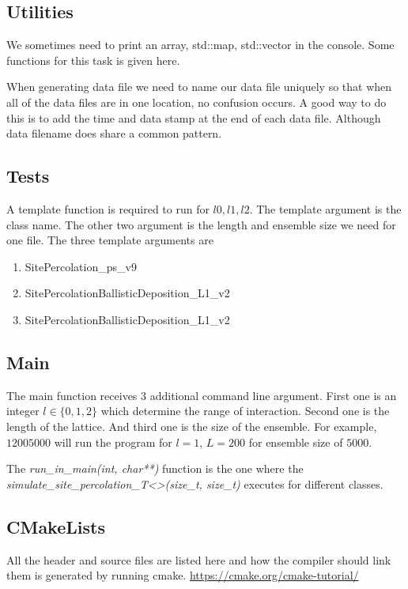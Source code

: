 	
	
	
	\subsection{Utilities}
	We sometimes need to print an array, std::map, std::vector in the console. Some functions for this task is given here. 
	
	
	When generating data file we need to name our data file uniquely so that when all of the data files are in one location, no confusion occurs. A good way to do this is to add the time and data stamp at the end of each data file. Although data filename does share a common pattern.
	
	
	
	\subsection{Tests}
	A template function is required to run for $l0, l1, l2$. The template argument is the class name. The other two argument is the length and ensemble size we need for one file. The three template arguments are
	\begin{enumerate}
		\item SitePercolation\_ps\_v9
		\item SitePercolationBallisticDeposition\_L1\_v2
		\item SitePercolationBallisticDeposition\_L1\_v2
	\end{enumerate}
	
	
	\subsection{Main}
	The main function receives 3 additional command line argument. First one is an integer $l\in\{0,1,2\}$ which determine the range of interaction. Second one is the length of the lattice. And third one is the size of the ensemble. For example, $1 200 5000$ will run the program for $l=1$, $L=200$ for ensemble size of $5000$.
	
	The \textit{run\_in\_main(int, char**)} function is the one where the  \textit{simulate\_site\_percolation\_T<>(size\_t, size\_t)} executes for different classes.
	
	
	
	\subsection{CMakeLists}
	All the header and source files are listed here and how the compiler should link them is generated by running cmake. \url{https://cmake.org/cmake-tutorial/}
	
